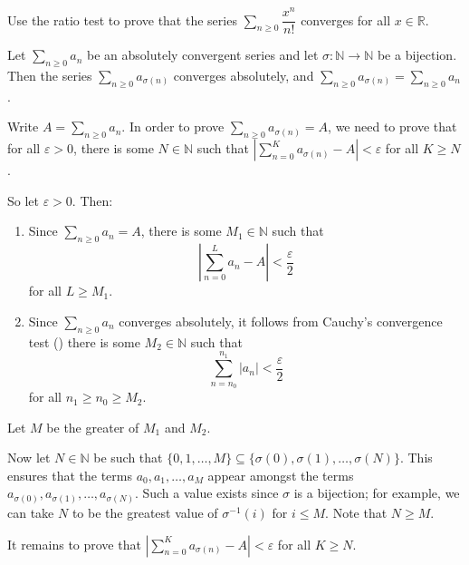 \begin{exercise}
\label{exExponentialFunctionCoverges}
Use the ratio test to prove that the series $\sum_{n \ge 0} \dfrac{x^n}{n!}$ converges for all $x \in \mathbb{R}$.
\end{exercise}

\begin{theorem}
\label{thmIndependenceOfOrdering}
Let $\displaystyle \sum_{n \ge 0} a_n$ be an absolutely convergent series and let $\sigma : \mathbb{N} \to \mathbb{N}$ be a bijection. Then the series $\displaystyle \sum_{n \ge 0} a_{\sigma(n)}$ converges absolutely, and $\displaystyle \sum_{n \ge 0} a_{\sigma(n)} = \sum_{n \ge 0} a_n$.
\end{theorem}

\begin{cproof}
Write $A = \displaystyle \sum_{n \ge 0} a_n$. In order to prove $\displaystyle \sum_{n \ge 0} a_{\sigma(n)} = A$, we need to prove that for all $\varepsilon > 0$, there is some $N \in \mathbb{N}$ such that $\left| \displaystyle\sum_{n=0}^K a_{\sigma(n)} - A \right| < \varepsilon$ for all $K \ge N$.

So let $\varepsilon > 0$. Then:
\begin{enumerate}[(1)]
\item Since $\displaystyle \sum_{n \ge 0} a_n = A$, there is some $M_1 \in \mathbb{N}$ such that
\[ \left| \sum_{n=0}^L a_n - A \right| < \dfrac{\varepsilon}{2} \]
for all $L \ge M_1$.
\item Since $\displaystyle \sum_{n \ge 0} a_n$ converges absolutely, it follows from Cauchy's convergence test () there is some $M_2 \in \mathbb{N}$ such that
\[ \sum_{n=n_0}^{n_1} |a_n| < \dfrac{\varepsilon}{2} \]
for all $n_1 \ge n_0 \ge M_2$.
\end{enumerate}

Let $M$ be the greater of $M_1$ and $M_2$.

Now let $N \in \mathbb{N}$ be such that $\{ 0, 1, \dots, M \} \subseteq \{ \sigma(0), \sigma(1), \dots, \sigma(N) \}$. This ensures that the terms $a_0, a_1, \dots, a_M$ appear amongst the terms $a_{\sigma(0)}, a_{\sigma(1)}, \dots, a_{\sigma(N)}$. Such a value exists since $\sigma$ is a bijection; for example, we can take $N$ to be the greatest value of $\sigma^{-1}(i)$ for $i \le M$. Note that $N \ge M$.

It remains to prove that $\left| \displaystyle\sum_{n=0}^K a_{\sigma(n)} - A \right| < \varepsilon$ for all $K \ge N$.


\end{cproof}
